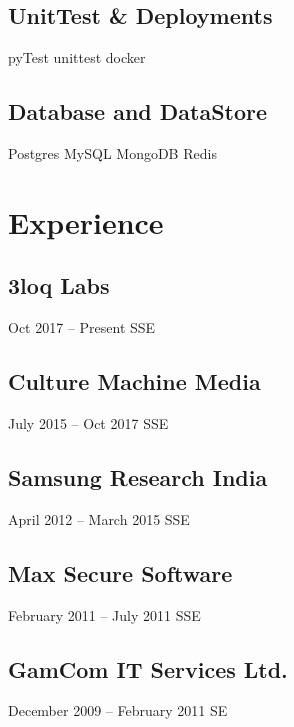 \documentclass[]{deedy-resume-openfont}
\begin{document}
\begin{minipage}[t]{0.33\textwidth}
\subsection{UnitTest \& Deployments}
pyTest \textbullet{} unittest  \textbullet{}  docker 
\vspace{2mm} 

\subsection{Database and DataStore}
Postgres \textbullet{} MySQL  \textbullet{}  MongoDB  \textbullet{} Redis

\sectionsep


\section{Experience} 
\subsection{3loq Labs}
Oct 2017 – Present \textbullet{} SSE
\vspace{2mm} 

\subsection{Culture Machine Media}
July 2015 – Oct 2017 \textbullet{} SSE
\vspace{2mm} 

\subsection{Samsung Research India}
April 2012 – March 2015 \textbullet{} SSE
\vspace{2mm} 

\subsection{Max Secure Software}
February 2011 – July 2011 \textbullet{} SSE
\vspace{2mm} 

\subsection{GamCom IT Services Ltd.}
December 2009 – February 2011 \textbullet{} SE
\sectionsep



\end{minipage}
\end{document}

